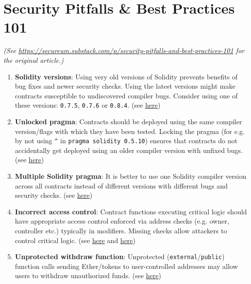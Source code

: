 \section{Security Pitfalls \& Best Practices 101}

\textit{(See \url{https://secureum.substack.com/p/security-pitfalls-and-best-practices-101} for the original article.)}\\

\begin{enumerate}
\item\textbf{Solidity versions}: Using very old versions of Solidity prevents benefits of bug fixes and newer security checks. Using the latest versions might make contracts susceptible to undiscovered compiler bugs. Consider using one of these versions: \verb|0.7.5|, \verb|0.7.6| or \verb|0.8.4|. (see \href{https://github.com/crytic/slither/wiki/Detector-Documentation\#incorrect-versions-of-solidity}{here})

\item\textbf{Unlocked pragma}: Contracts should be deployed using the same compiler version/flags with which they have been tested. Locking the pragma (for e.g. by not using \verb|^| in \verb|pragma solidity 0.5.10|) ensures that contracts do not accidentally get deployed using an older compiler version with unfixed bugs. (see \href{https://swcregistry.io/docs/SWC-103}{here})

\item\textbf{Multiple Solidity pragma}: It is better to use one Solidity compiler version across all contracts instead of different versions with different bugs and security checks. (see \href{https://github.com/crytic/slither/wiki/Detector-Documentation\#different-pragma-directives-are-used}{here})

\item\textbf{Incorrect access control}: Contract functions executing critical logic should have appropriate access control enforced via address checks (e.g. owner, controller etc.) typically in modifiers. Missing checks allow attackers to control critical logic. (see \href{https://docs.openzeppelin.com/contracts/3.x/api/access}{here} and \href{https://dasp.co/\#item-2}{here})

\item\textbf{Unprotected withdraw function}: Unprotected (\verb|external|/\verb|public|) function calls sending Ether/tokens to user-controlled addresses may allow users to withdraw unauthorized funds. (see \href{https://swcregistry.io/docs/SWC-105}{here})


\end{enumerate}
